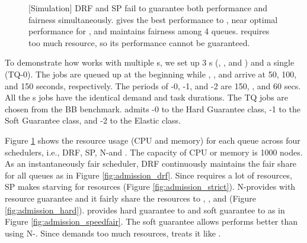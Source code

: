 \begin{figure}[!h]
    \vspace{-0.1cm}    
    \vspace{-0.1cm}    
    \caption{[Simulation] DRF and SP fail to guarantee both performance and fairness simultaneously. \name gives the best performance to , near optimal performance for , and maintains fairness among 4 queues.  requires too much resource, so its performance cannot be guaranteed.}
    \vspace{-0.5cm}    
    \label{fig:admission_control}
\end{figure}


To demonstrate how \name works with multiple {\burstq}s, we set up 3 {\burstq}s (, , and ) and a single \batchq (TQ-0).
The jobs  are queued up at the beginning while , , and  arrive at 50, 100, and 150 seconds, respectively.
The periods of {\burstq}-0, {\burstq}-1, and {\burstq}-2 are 150, , and 60 secs. All the {\burstq}s jobs have the identical demand and task durations.
The TQ jobs are chosen from the BB benchmark.
\name admits {\burstq}-0 to the Hard Guarantee class, {\burstq}-1 to the Soft Guarantee class, and {\burstq}-2 to the Elastic class.

Figure \ref{fig:admission_control} shows the resource usage (CPU and memory) for each queue across four schedulers, i.e., DRF, SP, N-\name and \name.
The capacity of CPU or memory is 1000 nodes.
As an instantaneously fair scheduler, DRF continuously maintains the fair share for all queues as in Figure \ref{fig:admission_drf}.
Since  requires a lot of resources, SP makes  starving for resources (Figure \ref{fig:admission_strict}). N-\name provides  with resource guarantee and it fairly share the resources to , , and  (Figure \ref{fig:admission_hard}).
\name provides hard guarantee to  and soft guarantee to  as in Figure \ref{fig:admission_speedfair}.
The soft guarantee allows  performs better than using N-\name.
Since  demands too much resources, \name treats it like .

